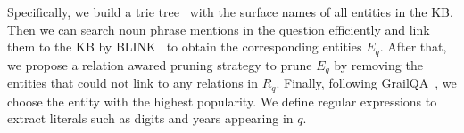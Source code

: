 Specifically, we build a trie tree~\cite{fredkin1960trie} with the surface names of all entities in the KB. Then we can search noun phrase mentions in the question efficiently and link them to the KB by BLINK~\cite{wu2019zero} to obtain the corresponding entities $E_q$. After that, we propose a relation awared pruning strategy to prune $E_q$ by removing the entities that could not link to any relations in $R_q$. Finally, following GrailQA~\cite{gu2021beyond}, we choose the entity with the highest popularity. 
We define regular expressions to extract literals such as digits and years appearing in $q$.




